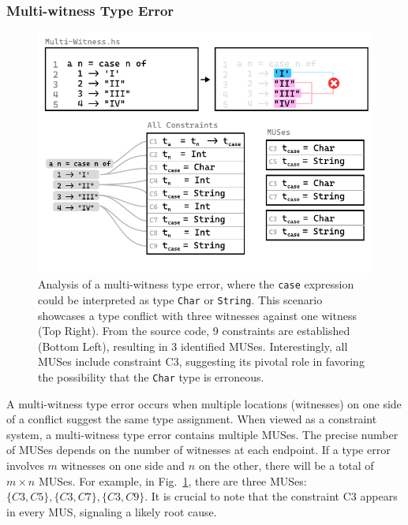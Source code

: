 \documentclass[pdflatex,sn-mathphys-num]{sn-jnl}%
\begin{document}
\subsubsection*{Multi-witness Type Error} 

\begin{figure}[hbt]
    \centering
\includegraphics[width=\linewidth]{images/Multi-Witness-MUS}
  \caption[Illustration of a multi-witness type error in the context of MUSes]{\label{fig:multi-witness-2}
  Analysis of a multi-witness type error, where the \texttt{case} expression could be interpreted as type \texttt{Char} or \texttt{String}. This scenario showcases a type conflict with three witnesses against one witness (Top Right). From the source code, 9 constraints are established (Bottom Left), resulting in 3 identified MUSes. Interestingly, all MUSes include constraint C3, suggesting its pivotal role in favoring the possibility that the \texttt{Char} type is erroneous.}
  \end{figure}

A multi-witness type error occurs when multiple locations (witnesses) on one side of a conflict suggest the same type assignment. When viewed as a constraint system, a multi-witness type error contains multiple MUSes. The precise number of MUSes depends on the number of witnesses at each endpoint. If a type error involves $m$ witnesses on one side and $n$ on the other, there will be a total of $m \times n$ MUSes. For example, in Fig.~\ref{fig:multi-witness-2}, there are three MUSes: $\{C3, C5\}, \{C3, C7\}, \{C3, C9\}$. It is crucial to note that the constraint C3 appears in every MUS, signaling a likely root cause.
\end{document}
